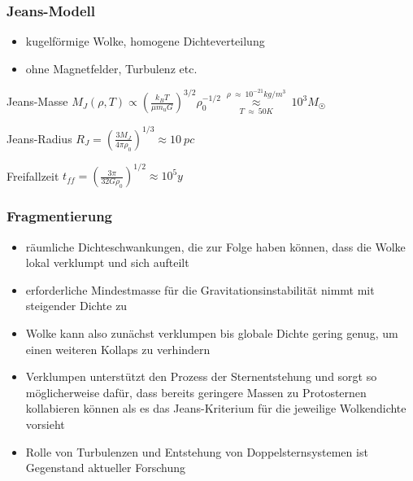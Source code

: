 \documentclass{beamer}
\begin{document}
\begin{frame}\frametitle{Jeans-Modell}

\begin{itemize}
\item kugelförmige Wolke, homogene Dichteverteilung
\item ohne Magnetfelder, Turbulenz etc.
\end{itemize}

\begin{block}{Jeans-Masse}
$M_J (\rho, T) \propto \left (\frac{k_B T}{\mu m_u G} \right)^{3/2} \rho_0^{-1/2} \ \overset{\rho \ \approx \ 10^{-21} kg/m^3}{\underset{T \ \approx \ 50 K}{\approx}} \ 10^3 M_{\astrosun}$
  \end{block}
  
  \begin{block}{Jeans-Radius}
$R_J = \left( \frac{3 M_J}{4 \pi \rho_0} \right)^{1/3} \approx 10 \ pc$
  \end{block}
  
  \begin{block}{Freifallzeit}
$t_{ff} = \left( \frac{3 \pi}{32 G \rho_0} \right)^{1/2} \approx 10^5 y$
  \end{block}

\end{frame}

\begin{frame}\frametitle{Fragmentierung}

\begin{itemize}
\item räumliche Dichteschwankungen, die zur Folge haben können, dass die Wolke lokal verklumpt und sich aufteilt
\item erforderliche Mindestmasse für die Gravitationsinstabilität nimmt mit steigender Dichte zu
\item Wolke kann also zunächst verklumpen bis globale Dichte gering genug, um einen weiteren Kollaps zu verhindern
\item Verklumpen unterstützt den Prozess der Sternentstehung und sorgt so möglicherweise dafür, dass bereits geringere Massen zu Protosternen kollabieren können als es das Jeans-Kriterium für die jeweilige Wolkendichte vorsieht
\item Rolle von Turbulenzen und Entstehung von Doppelsternsystemen ist Gegenstand aktueller Forschung
\end{itemize}

\end{frame}
\end{document}

